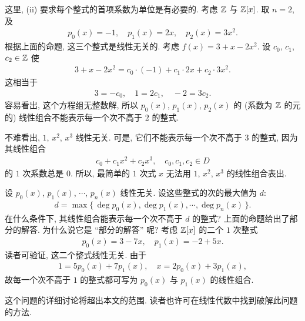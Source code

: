 \begin{remark}
    这里, (ii) 要求每个整式的首项系数为单位是有必要的. 考虑 $\mathbb{Z}$ 与 $\mathbb{Z}[x]$. 取 $n=2$, 及
    \begin{align*}
        p_0 (x) = -1, \quad p_1 (x) = 2x, \quad p_2 (x) = 3x^2.
    \end{align*}
    根据上面的命题, 这三个整式是线性无关的. 考虑 $f(x) = 3 + x - 2x^2$. 设 $c_0$, $c_1$, $c_2 \in \mathbb{Z}$ 使
    \begin{align*}
        3 + x - 2x^2 = c_0 \cdot (-1) + c_1 \cdot 2x + c_2 \cdot 3x^2.
    \end{align*}
    这相当于
    \begin{align*}
        3 = -c_0, \quad 1 = 2c_1, \quad -2 = 3c_2.
    \end{align*}
    容易看出, 这个方程组无整数解, 所以 $p_0 (x)$, $p_1 (x)$, $p_2 (x)$ 的 (系数为 $\mathbb{Z}$ 的元的) 线性组合不能表示每一个次不高于 $2$ 的整式.
\end{remark}

\begin{remark}
    不难看出, $1$, $x^2$, $x^3$ 线性无关. 可是, 它们不能表示每一个次不高于 $3$ 的整式, 因为其线性组合
    \begin{align*}
        c_0 + c_1 x^2 + c_2 x^3, \quad c_0, c_1, c_2 \in D
    \end{align*}
    的 $1$ 次系数总是 $0$. 所以, 最简单的 $1$ 次式 $x$ 无法用 $1$, $x^2$, $x^3$ 的线性组合表出.

    设 $p_0 (x)$, $p_1 (x)$, $\cdots$, $p_n (x)$ 线性无关. 设这些整式的次的最大值为 $d$:
    \begin{align*}
        d = \max \{\, \deg p_0 (x), \deg p_1 (x), \cdots, \deg p_n (x) \,\}.
    \end{align*}
    在什么条件下, 其线性组合能表示每一个次不高于 $d$ 的整式? 上面的命题给出了部分的解答. 为什么说它是 ``部分的解答'' 呢? 考虑 $\mathbb{Z}[x]$ 的二个 $1$ 次整式
    \begin{align*}
        p_0 (x) = 3 - 7x, \quad p_1 (x) = -2 + 5x.
    \end{align*}
    读者可验证, 这二个整式线性无关. 由于
    \begin{align*}
        1 = 5p_0 (x) + 7p_1 (x), \quad x = 2p_0 (x) + 3p_1 (x),
    \end{align*}
    故每一个次不高于 $1$ 的整式都可写为 $p_0 (x)$ 与 $p_1 (x)$ 的线性组合.

    这个问题的详细讨论将超出本文的范围. 读者也许可在线性代数中找到破解此问题的方法.
\end{remark}

